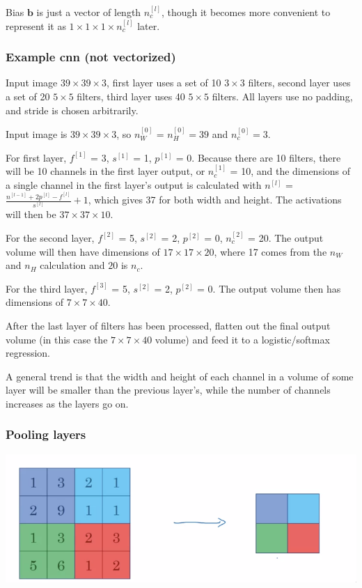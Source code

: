 \documentclass[12pt]{article}
\begin{document}
Bias $\bm b$ is just a vector of length $n_c^{[l]}$, though it becomes more convenient
to represent it as $1 \times 1 \times 1 \times n_c^{[l]}$ later.

\subsubsection{Example cnn (not vectorized)}

Input image $39 \times 39 \times 3$, first layer uses a set of 10 $3 \times 3$ filters,
second layer uses a set of 20 $5 \times 5$ filters, third layer uses 40 $5 \times 5$
filters. All layers use no padding, and stride is chosen arbitrarily.

Input image is $39 \times 39 \times 3$, so $n_W^{[0]}$ = $n_H^{[0]} = 39$
and $n_c^{[0]} = 3$.

For first layer, $f^{[1]}$ = 3, $s^{[1]}$ = 1, $p^{[1]}$ = 0. Because there are 10 filters,
there will be 10 channels in the first layer output, or $n_c^{[1]}$ = 10, and the dimensions
of a single channel in the first layer's output is calculated with $n^{[l]}$ =
$\frac{n^{[l-1]}+2p^{[l]}-f^{[l]}}{s^{[l]}} + 1$, which gives 37 for both width and height.
The activations will then be $37 \times 37 \times 10$.

For the second layer, $f^{[2]}$ = 5, $s^{[2]}$ = 2, $p^{[2]}$ = 0, $n_c^{[2]}$ = 20. The
output volume will then have dimensions of $17 \times 17 \times 20$, where 17 comes from
the $n_W$ and $n_H$ calculation and $20$ is $n_c$.

For the third layer, $f^{[3]}$ = 5, $s^{[2]}$ = 2, $p^{[2]}$ = 0. The output volume
then has dimensions of $7 \times 7 \times 40$.

After the last layer of filters has been processed, flatten out the final output volume
(in this case the $7 \times 7 \times 40$ volume) and feed it to a logistic/softmax regression.

A general trend is that the width and height of each channel in a volume of some layer will
be smaller than the previous layer's, while the number of channels increases as the layers go on.

\subsubsection{Pooling layers}

\includegraphics[scale=.5]{images/max-pooling.png}
\end{document}
